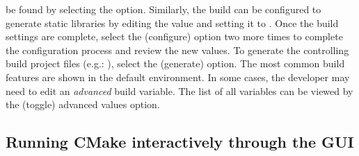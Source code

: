be found by selecting the \comp{[h]} option.  Similarly, the build can be configured to generate static libraries by editing the  value and setting it to .  Once the build settings are complete, select the \comp{[c]} (configure) option two more times to complete the configuration process and review the new values.    To generate the controlling build project files (e.g.: ), select the \comp{[g]} (generate) option.  The most common build features are shown in the default  environment.  In some cases, the developer may need to edit an {\it advanced} build variable.  The list of all variables can be viewed by the \comp{[t]} (toggle) advanced values option.

\subsection{Running CMake interactively through the GUI}
\label{sec:running_configure_cmakegui}

